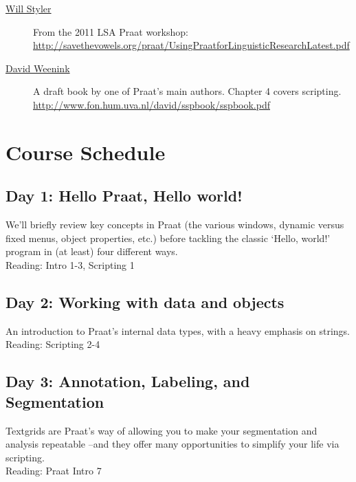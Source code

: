 \documentclass [12pt]{article}
\begin{document}
\begin{description}
     \item[\href{http://savethevowels.org/praat/UsingPraatforLinguisticResearchLatest.pdf}{Will Styler}] From the 2011 LSA Praat workshop:\\\href{http://savethevowels.org/praat/UsingPraatforLinguisticResearchLatest.pdf}{http://savethevowels.org/praat/UsingPraatforLinguisticResearchLatest.pdf}
     \item[\href{http://www.fon.hum.uva.nl/david/sspbook/sspbook.pdf}{David Weenink}] A draft book by one of Praat's main authors.  Chapter 4 covers scripting. \href{http://www.fon.hum.uva.nl/david/sspbook/sspbook.pdf}{http://www.fon.hum.uva.nl/david/sspbook/sspbook.pdf}
\end{description}

\section*{Course Schedule}

\subsection*{Day 1: Hello Praat, Hello world!}
We'll briefly review key concepts in Praat (the various windows, dynamic versus fixed menus, object properties, etc.) before tackling the classic `Hello, world!' program in (at least) four different ways.\\

Reading: Intro 1-3, Scripting 1

\subsection*{Day 2: Working with data and objects}
An introduction to Praat's internal data types, with a heavy emphasis on strings.\\

Reading: Scripting 2-4

\subsection*{Day 3: Annotation, Labeling, and Segmentation}
Textgrids are Praat's way of allowing you to make your segmentation and analysis repeatable --and they offer many opportunities to simplify your life via scripting.\\

Reading: Praat Intro 7
\end{document}
